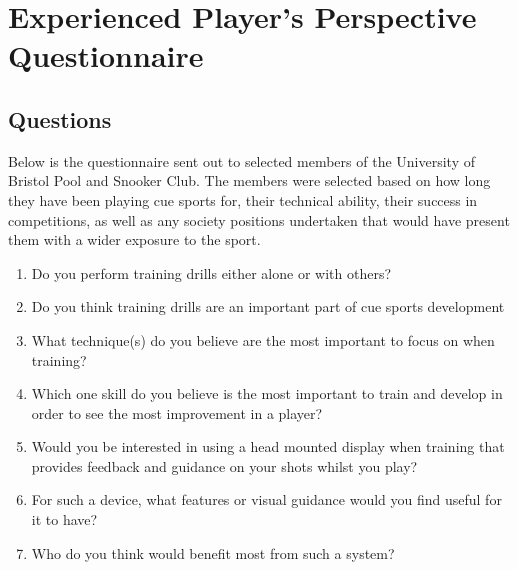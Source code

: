 \documentclass[ %
                author={Finn Alexander Wilkinson},
                supervisor={Dr. Andrew Calway},
                degree={MEng},
                title={\centering A Mixed Reality Aim Assistant for Pool and Snooker},
                subtitle={},
                type={Enterprise},
                year={2021} ]{dissertation}
\begin{document}



\chapter{Experienced Player's Perspective Questionnaire}
\label{appx:UOBPSCSurvey}
\section{Questions}
Below is the questionnaire sent out to selected members of the University of Bristol Pool and Snooker Club. The members were selected based on how long they have been playing cue sports for, their technical ability, their success in competitions, as well as any society positions undertaken that would have present them with a wider exposure to the sport.

\begin{enumerate}
    \item Do you perform training drills either alone or with others?
    \item Do you think training drills are an important part of cue sports development
    \item What technique(s) do you believe are the most important to focus on when training?
    \item Which one skill do you believe is the most important to train and develop in order to see the most improvement in a player?
    \item Would you be interested in using a head mounted display when training that provides feedback and guidance on your shots whilst you play?
    \item For such a device, what features or visual guidance would you find useful for it to have?
    \item Who do you think would benefit most from such a system?
\end{enumerate}
\end{document}
